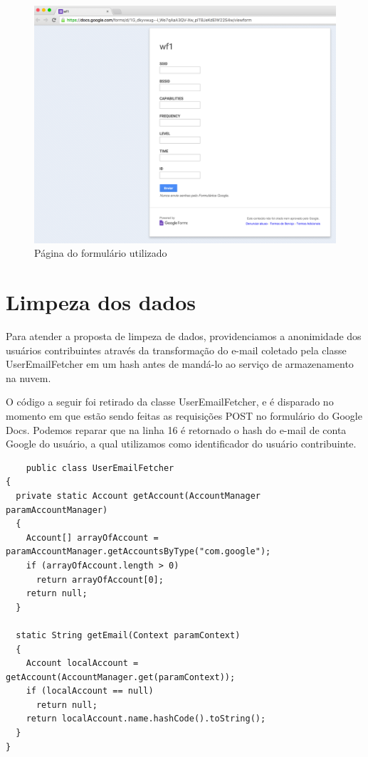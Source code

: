 \documentclass[12pt, %
openright, 
oneside,
a4paper,
brazil]{facom-ufu-abntex2}
\begin{document}
 
\begin{figure}[hbt]
  \includegraphics[scale=0.4]{form}
  \caption{Página do formulário utilizado}
\end{figure}


\section{Limpeza dos dados}
Para atender a proposta de limpeza de dados, providenciamos a anonimidade dos usuários contribuintes através da transformação do e-mail coletado pela classe UserEmailFetcher em um hash antes de mandá-lo ao serviço de armazenamento na nuvem.

O código a seguir foi retirado da classe UserEmailFetcher, e é disparado no momento em que estão sendo feitas as requisições POST no formulário do Google Docs. Podemos reparar que na linha 16 é retornado o hash do e-mail de conta Google do usuário, a qual utilizamos como identificador do usuário contribuinte.


\begin{lstlisting}
	public class UserEmailFetcher
{
  private static Account getAccount(AccountManager paramAccountManager)
  {
    Account[] arrayOfAccount = paramAccountManager.getAccountsByType("com.google");
    if (arrayOfAccount.length > 0)
      return arrayOfAccount[0];
    return null;
  }

  static String getEmail(Context paramContext)
  {
    Account localAccount = getAccount(AccountManager.get(paramContext));
    if (localAccount == null)
      return null;
    return localAccount.name.hashCode().toString();
  }
}
\end{lstlisting}
\end{document}

